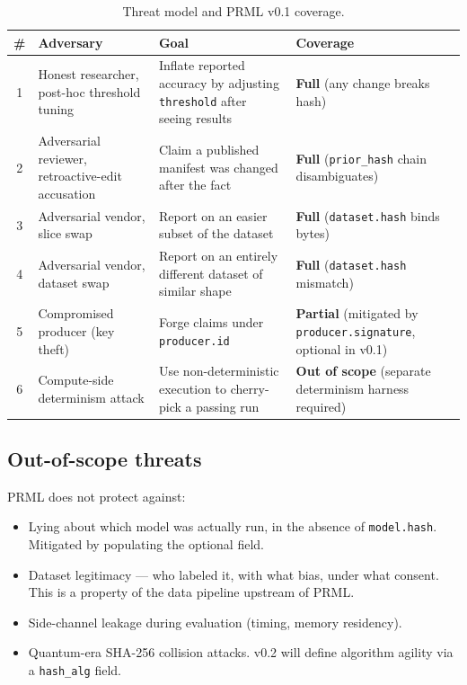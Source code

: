 \documentclass[11pt, a4paper]{article}
\begin{document}
\begin{table}[h]
\centering
\small
\begin{tabular}{@{}c p{4cm} p{4cm} l@{}}
\toprule
\# & Adversary & Goal & Coverage \\
\midrule
1 & Honest researcher, post-hoc threshold tuning & Inflate reported accuracy by adjusting \texttt{threshold} after seeing results & \textbf{Full} (any change breaks hash) \\
2 & Adversarial reviewer, retroactive-edit accusation & Claim a published manifest was changed after the fact & \textbf{Full} (\texttt{prior\_hash} chain disambiguates) \\
3 & Adversarial vendor, slice swap & Report on an easier subset of the dataset & \textbf{Full} (\texttt{dataset.hash} binds bytes) \\
4 & Adversarial vendor, dataset swap & Report on an entirely different dataset of similar shape & \textbf{Full} (\texttt{dataset.hash} mismatch) \\
5 & Compromised producer (key theft) & Forge claims under \texttt{producer.id} & \textbf{Partial} (mitigated by \texttt{producer.signature}, optional in v0.1) \\
6 & Compute-side determinism attack & Use non-deterministic execution to cherry-pick a passing run & \textbf{Out of scope} (separate determinism harness required) \\
\bottomrule
\end{tabular}
\caption{Threat model and PRML v0.1 coverage.}
\label{tab:threat}
\end{table}

\subsection{Out-of-scope threats}

PRML does not protect against:

\begin{itemize}[leftmargin=2em, itemsep=0.2em]
  \item Lying about which model was actually run, in the absence of \texttt{model.hash}. Mitigated by populating the optional field.
  \item Dataset legitimacy --- who labeled it, with what bias, under what consent. This is a property of the data pipeline upstream of PRML.
  \item Side-channel leakage during evaluation (timing, memory residency).
  \item Quantum-era SHA-256 collision attacks. v0.2 will define algorithm agility via a \texttt{hash\_alg} field.
\end{itemize}
\end{document}
